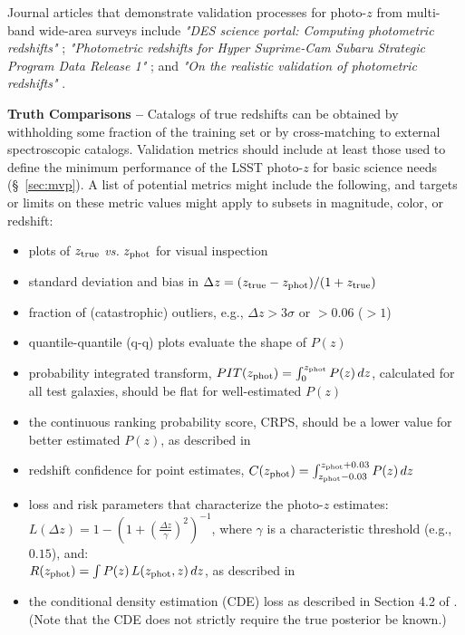 \documentclass[DM,lsstdraft,toc]{lsstdoc}
\begin{document}
Journal articles that demonstrate validation processes for photo-$z$ from multi-band wide-area surveys include {\it "DES science portal: Computing photometric redshifts"} \citep{2018A&C....25...58G}; {\it "Photometric redshifts for Hyper Suprime-Cam Subaru Strategic Program Data Release 1"} \citep{2018PASJ...70S...9T}; and {\it "On the realistic validation of photometric redshifts"} \citep{2017MNRAS.468.4323B}. 

{\bf Truth Comparisons --} 
Catalogs of true redshifts can be obtained by withholding some fraction of the training set or by cross-matching to external spectroscopic catalogs. Validation metrics should include at least those used to define the minimum performance of the LSST photo-$z$ for basic science needs (\S~\ref{sec:mvp}). A list of potential metrics might include the following, and targets or limits on these metric values might apply to subsets in magnitude, color, or redshift: 
\vspace{-15pt}
\begin{itemize}
\item plots of $z_{\rm true}$ {\it vs.} $z_{\rm phot}$ for visual inspection
\item standard deviation and bias in $\Delta z = (z_{\rm true}-z_{\rm phot})/(1+z_{\rm true})$
\item fraction of (catastrophic) outliers, e.g., $\Delta z > 3\sigma$ or $>0.06$ ($>1$)
\item quantile-quantile (q-q) plots evaluate the shape of $P(z)$
\item probability integrated transform, $PIT(z_{\rm phot}) = \int_{0}^{z_{\rm phot}} P(z)\,dz$, calculated for all test galaxies, should be flat for well-estimated $P(z)$ \citep{2016arXiv160808016P}
\item the continuous ranking probability score, CRPS, should be a lower value for better estimated $P(z)$, as described in \citep{2016arXiv160808016P}
\item redshift confidence for point estimates, $C(z_{\rm phot}) = \int_{z_{\rm phot}-0.03}^{z_{\rm phot}+0.03} P(z)\,dz $
\item loss and risk parameters that characterize the photo-$z$ estimates:\\
$L(\Delta z) = 1 - \left(1+ \left(\frac{\Delta z}{\gamma} \right)^2 \right)^{-1}$, 
where $\gamma$ is a characteristic threshold (e.g., $0.15$), and:\\
$R(z_{\rm phot}) = \int P(z)\,L(z_{\rm phot},z)\,dz$, as described in \citet{2018PASJ...70S...9T}
\item the conditional density estimation (CDE) loss as described in Section 4.2 of \citet{2020arXiv200103621S}. (Note that the CDE does not strictly require the true posterior be known.)
\end{itemize}
\end{document}
